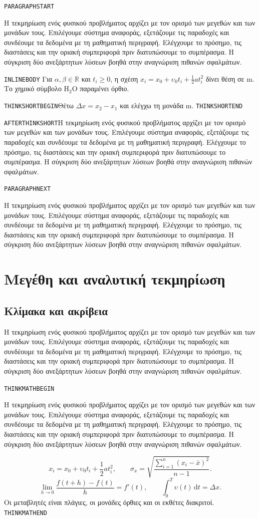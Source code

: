 \newcommand{\EditorialProbeParagraph}{Η τεκμηρίωση ενός φυσικού προβλήματος αρχίζει με τον ορισμό των μεγεθών
και των μονάδων τους. Επιλέγουμε σύστημα αναφοράς, εξετάζουμε τις παραδοχές
και συνδέουμε τα δεδομένα με τη μαθηματική περιγραφή. Ελέγχουμε το πρόσημο,
τις διαστάσεις και την οριακή συμπεριφορά πριν διατυπώσουμε το συμπέρασμα.
Η σύγκριση δύο ανεξάρτητων λύσεων βοηθά στην αναγνώριση πιθανών σφαλμάτων.\par}
\frontmatter
\tableofcontents
\mainmatter
{}
\texttt{PARAGRAPHSTART}\par
\EditorialProbeParagraph
\noindent\texttt{INLINEBODY}\quad
Για $\alpha,\beta\in\mathbb R$ και $t_i\ge0$, η σχέση
$x_i=x_0+\upsilon_0t_i+\tfrac12at_i^2$ δίνει θέση σε $\mathrm{m}$.
Το χημικό σύμβολο $\mathrm{H_2O}$ παραμένει όρθιο.\par
\begin{ThinkBox}
\texttt{THINKSHORTBEGIN}\quad Θέτω $\Delta x=x_2-x_1$ και ελέγχω τη μονάδα $\mathrm{m}$.
\texttt{THINKSHORTEND}
\end{ThinkBox}
\texttt{AFTERTHINKSHORT}\quad\EditorialProbeParagraph
\clearpage
\texttt{PARAGRAPHNEXT}\par\EditorialProbeParagraph
\section{Μεγέθη και αναλυτική τεκμηρίωση}
\subsection{Κλίμακα και ακρίβεια}
\EditorialProbeParagraph
\begin{ThinkBox}
\texttt{THINKMATHBEGIN}\par
\EditorialProbeParagraph
\[
 x_i=x_0+\upsilon_0t_i+\frac12at_i^2,\qquad
 \sigma_x=\sqrt{\frac{\sum_{i=1}^{n}(x_i-\bar{x})^2}{n-1}}.
\]
\[
 \lim_{h\to0}\frac{f(t+h)-f(t)}{h}=f'(t),\qquad
 \int_0^T\upsilon(t)\,\mathrm{d}t=\Delta x.
\]
Οι μεταβλητές είναι πλάγιες, οι μονάδες όρθιες και οι εκθέτες διακριτοί.
\texttt{THINKMATHEND}
\end{ThinkBox}
\clearpage
